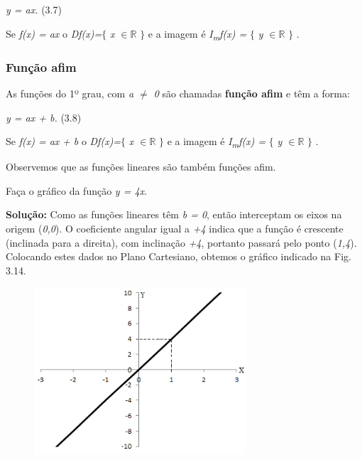 \begin{FlushRight}
\textit{y = ax.} \tab (3.7)
\end{FlushRight}

Se \textit{f(x) = ax}  o \textit{Df(x)=}$ \{ $ \textit{ x $ \in \mathbb{R} $} $ \} $  e a imagem é    \textit{I\textsubscript{m}f(x) =} $ \{ $ \textit{ y $\in \mathbb{R}$} $ \} $ .

\subsubsection{Função afim}

As funções do 1º grau, com \textit{a $ \neq $   0}  são chamadas \textbf{função afim} e têm a forma:

\begin{FlushRight}
\textit{y = ax + b.} \tab (3.8)
\end{FlushRight}

Se \textit{f(x) = ax} \textit{+ b} o \textit{Df(x)=}$ \{ $ \textit{ x $\in \mathbb{R}$} $ \} $  e a imagem é \textit{I\textsubscript{m}f(x) =} $ \{ $ \textit{ y $\in \mathbb{R}$} $ \} $ .

Observemos que as funções lineares são também funções afim.

\begin{texemplo}
Faça o gráfico da função  \textit{y = 4x}.

\textbf{Solução:} Como as funções lineares têm  \textit{b = 0}, então interceptam os eixos na origem (\textit{0,0}). O coeficiente angular igual a \textit{+4} indica que a função é crescente (inclinada para a direita), com inclinação \textit{+4}, portanto passará pelo ponto (\textit{1,4}). Colocando estes dados no Plano Cartesiano, obtemos o gráfico indicado na Fig. 3.14.

\begin{figure}[H]
	\begin{Center}
		\includegraphics[width=3.12in,height=2.44in]{capitulos/funcao_do_primeiro_grau/media/image21.png} \qedsymbol{}
	\end{Center}
\end{figure}
\end{texemplo}

